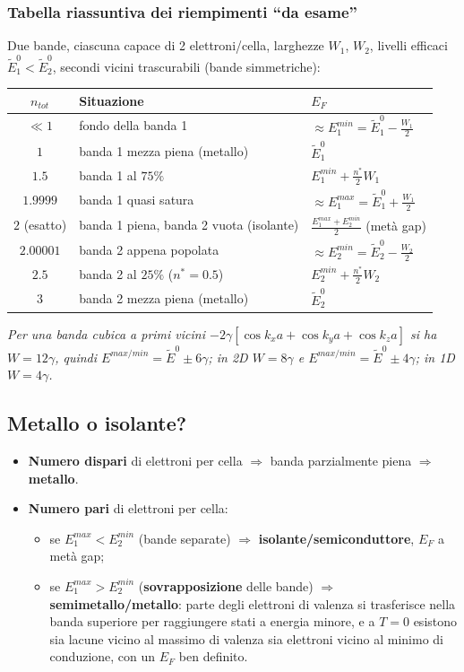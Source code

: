 \subsubsection*{Tabella riassuntiva dei riempimenti ``da esame''}
Due bande, ciascuna capace di 2 elettroni/cella, larghezze $W_1$, $W_2$, livelli efficaci $\tilde E_1^0<\tilde E_2^0$, secondi vicini trascurabili (bande simmetriche):
\begin{center}
\renewcommand{\arraystretch}{1.5}
\begin{tabular}{c l l}
\toprule
$n_{tot}$ & Situazione & $E_F$ \\
\midrule
$\ll1$ & fondo della banda 1 & $\approx E_1^{min}=\tilde E_1^0-\frac{W_1}{2}$ \\
$1$ & banda 1 mezza piena (metallo) & $\tilde E_1^0$ \\
$1.5$ & banda 1 al $75\%$ & $E_1^{min}+\frac{n^*}{2}W_1$ \\
$1.9999$ & banda 1 quasi satura & $\approx E_1^{max}=\tilde E_1^0+\frac{W_1}{2}$ \\
$2$ (esatto) & banda 1 piena, banda 2 vuota (isolante) & $\frac{E_1^{max}+E_2^{min}}{2}$ (metà gap) \\
$2.00001$ & banda 2 appena popolata & $\approx E_2^{min}=\tilde E_2^0-\frac{W_2}{2}$ \\
$2.5$ & banda 2 al $25\%$ ($n^*=0.5$) & $E_2^{min}+\frac{n^*}{2}W_2$ \\
$3$ & banda 2 mezza piena (metallo) & $\tilde E_2^0$ \\
\bottomrule
\end{tabular}
\end{center}
\textit{Per una banda cubica a primi vicini $-2\gamma\left[\cos k_xa+\cos k_ya+\cos k_za\right]$ si ha $W=12\gamma$, quindi $E^{max/min}=\tilde E^0\pm6\gamma$; in 2D $W=8\gamma$ e $E^{max/min}=\tilde E^0\pm4\gamma$; in 1D $W=4\gamma$.}


\subsection{Metallo o isolante?}
\begin{itemize}
  \item \textbf{Numero dispari} di elettroni per cella $\Rightarrow$ banda parzialmente piena $\Rightarrow$ \textbf{metallo}.
  \item \textbf{Numero pari} di elettroni per cella:
  \begin{itemize}
    \item se $E_1^{max} < E_2^{min}$ (bande separate) $\Rightarrow$ \textbf{isolante/semiconduttore}, $E_F$ a metà gap;
    \item se $E_1^{max} > E_2^{min}$ (\textbf{sovrapposizione} delle bande) $\Rightarrow$ \textbf{semimetallo/metallo}: parte degli elettroni di valenza si trasferisce nella banda superiore per raggiungere stati a energia minore, e a $T=0$ esistono sia lacune vicino al massimo di valenza sia elettroni vicino al minimo di conduzione, con un $E_F$ ben definito.
  \end{itemize}
\end{itemize}


